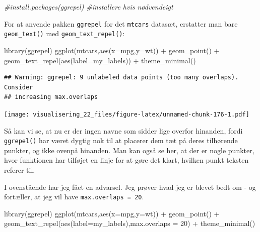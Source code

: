 \documentclass[
]{book}
\newenvironment{Shaded}{\begin{snugshade}}{\end{snugshade}}
\newcommand{\AttributeTok}[1]{\textcolor[rgb]{0.77,0.63,0.00}{#1}}
\newcommand{\CommentTok}[1]{\textcolor[rgb]{0.56,0.35,0.01}{\textit{#1}}}
\newcommand{\DecValTok}[1]{\textcolor[rgb]{0.00,0.00,0.81}{#1}}
\newcommand{\FunctionTok}[1]{\textcolor[rgb]{0.00,0.00,0.00}{#1}}
\newcommand{\NormalTok}[1]{#1}
\newcommand{\SpecialCharTok}[1]{\textcolor[rgb]{0.00,0.00,0.00}{#1}}
\begin{document}
\begin{Shaded}
\begin{Highlighting}[]
\CommentTok{\#install.packages(ggrepel) \#installere hvis nødvendeigt}
\end{Highlighting}
\end{Shaded}

For at anvende pakken \texttt{ggrepel} for det \texttt{mtcars} datasæt, erstatter man bare \texttt{geom\_text()} med \texttt{geom\_text\_repel()}:

\begin{Shaded}
\begin{Highlighting}[]
\FunctionTok{library}\NormalTok{(ggrepel)}
\FunctionTok{ggplot}\NormalTok{(mtcars,}\FunctionTok{aes}\NormalTok{(}\AttributeTok{x=}\NormalTok{mpg,}\AttributeTok{y=}\NormalTok{wt)) }\SpecialCharTok{+} 
  \FunctionTok{geom\_point}\NormalTok{() }\SpecialCharTok{+}
  \FunctionTok{geom\_text\_repel}\NormalTok{(}\FunctionTok{aes}\NormalTok{(}\AttributeTok{label=}\NormalTok{my\_labels)) }\SpecialCharTok{+} 
  \FunctionTok{theme\_minimal}\NormalTok{()}
\end{Highlighting}
\end{Shaded}

\begin{verbatim}
## Warning: ggrepel: 9 unlabeled data points (too many overlaps). Consider
## increasing max.overlaps
\end{verbatim}

\texttt{[image: visualisering\_22\_files/figure-latex/unnamed-chunk-176-1.pdf]}

Så kan vi se, at nu er der ingen navne som sidder lige overfor hinanden, fordi \texttt{ggrepel()} har været dygtig nok til at placerer dem tæt på deres tilhørende punkter, og ikke ovenpå hinanden. Man kan også se her, at der er nogle punkter, hvor funktionen har tilføjet en linje for at gøre det klart, hvilken punkt teksten referer til.

I ovenstående har jeg fået en advarsel. Jeg prøver hvad jeg er blevet bedt om - og fortæller, at jeg vil have \texttt{max.overlaps\ =\ 20}.

\begin{Shaded}
\begin{Highlighting}[]
\FunctionTok{library}\NormalTok{(ggrepel)}
\FunctionTok{ggplot}\NormalTok{(mtcars,}\FunctionTok{aes}\NormalTok{(}\AttributeTok{x=}\NormalTok{mpg,}\AttributeTok{y=}\NormalTok{wt)) }\SpecialCharTok{+} 
  \FunctionTok{geom\_point}\NormalTok{() }\SpecialCharTok{+}
  \FunctionTok{geom\_text\_repel}\NormalTok{(}\FunctionTok{aes}\NormalTok{(}\AttributeTok{label=}\NormalTok{my\_labels),}\AttributeTok{max.overlaps =} \DecValTok{20}\NormalTok{) }\SpecialCharTok{+}
  \FunctionTok{theme\_minimal}\NormalTok{()}
\end{Highlighting}
\end{Shaded}
\end{document}
